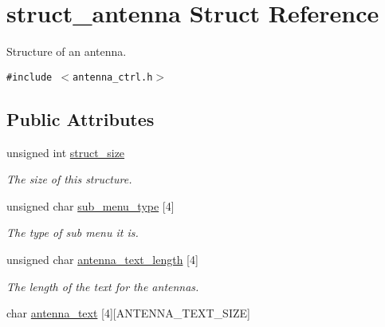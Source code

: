 \hypertarget{structstruct__antenna}{
\section{struct\_\-antenna Struct Reference}
\label{structstruct__antenna}
}
Structure of an antenna.  


{\tt \#include $<$antenna\_\-ctrl.h$>$}

\subsection*{Public Attributes}
\begin{CompactItemize}
\item 
\hypertarget{structstruct__antenna_b730ee9561be72cc7aca1b15bbda2fd0}{
unsigned int \hyperlink{structstruct__antenna_b730ee9561be72cc7aca1b15bbda2fd0}{struct\_\-size}}
\label{structstruct__antenna_b730ee9561be72cc7aca1b15bbda2fd0}

\begin{CompactList}\small\item\em The size of this structure. \item\end{CompactList}\item 
\hypertarget{structstruct__antenna_7ff9878df5789c291f68623ad50ab2a9}{
unsigned char \hyperlink{structstruct__antenna_7ff9878df5789c291f68623ad50ab2a9}{sub\_\-menu\_\-type} \mbox{[}4\mbox{]}}
\label{structstruct__antenna_7ff9878df5789c291f68623ad50ab2a9}

\begin{CompactList}\small\item\em The type of sub menu it is. \item\end{CompactList}\item 
\hypertarget{structstruct__antenna_70fcd4a864e7f12f8c24c309b016dd64}{
unsigned char \hyperlink{structstruct__antenna_70fcd4a864e7f12f8c24c309b016dd64}{antenna\_\-text\_\-length} \mbox{[}4\mbox{]}}
\label{structstruct__antenna_70fcd4a864e7f12f8c24c309b016dd64}

\begin{CompactList}\small\item\em The length of the text for the antennas. \item\end{CompactList}\item 
\hypertarget{structstruct__antenna_f8fe5633737c853897ed2c478c978119}{
char \hyperlink{structstruct__antenna_f8fe5633737c853897ed2c478c978119}{antenna\_\-text} \mbox{[}4\mbox{]}\mbox{[}ANTENNA\_\-TEXT\_\-SIZE\mbox{]}}
\label{structstruct__antenna_f8fe5633737c853897ed2c478c978119}


\end{CompactItemize}

